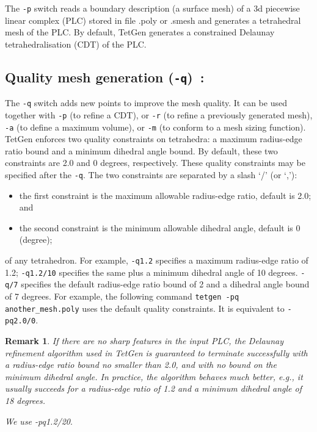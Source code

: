 \documentclass[12pt,twoside,a4paper]{article}
\numberwithin{equation}{section}
\newtheorem{remark}{Remark}[section]
\newcommand{\tetp}{\texttt{-p}}
\newcommand{\tetq}{\texttt{-q}}
\newcommand{\tetr}{\texttt{-r}}
\newcommand{\teta}{\texttt{-a}}
\newcommand{\tetm}{\texttt{-m}}
\begin{document}
The \tetp{} switch reads a boundary description (a surface mesh) of a 3d
piecewise linear complex (PLC) stored in file .poly or .smesh and
generates a tetrahedral mesh of the PLC.  By default, TetGen generates a
constrained Delaunay tetrahedralisation (CDT) of the PLC.


\subsection[Quality mesh generation]
{Quality mesh generation (\tetq{})~\cite[p. 39]{Si2013}:}

The \tetq{} switch adds new points to improve the mesh quality. It can be
used together with \tetp{} (to refine a CDT), or \tetr{} (to refine a
previously generated mesh), \teta{} (to define a maximum volume), or \tetm{}
(to conform to a mesh sizing function).  TetGen enforces two quality
constraints on tetrahedra: a maximum radius-edge ratio bound and a minimum
dihedral angle bound. By default, these two constraints are 2.0 and 0
degrees, respectively. These quality constraints may be specified after the
\tetq{}.  The two constraints are separated by a slash ‘/’ (or ‘,’):
\begin{itemize}
  \item the first constraint is the maximum allowable radius-edge ratio, 
    default is 2.0; and 
  \item the second constraint is the minimum allowable dihedral angle, 
    default is 0 (degree);
\end{itemize}
of any tetrahedron. For example, \texttt{-q1.2} specifies a maximum
radius-edge ratio of 1.2; \texttt{-q1.2/10} specifies the same plus a
minimum dihedral angle of 10 degrees. \texttt{-q/7} specifies the default
radius-edge ratio bound of 2 and a dihedral angle bound of 7 degrees.  For
example, the following command \texttt{tetgen -pq another\_mesh.poly} uses
the default quality constraints.  It is equivalent to \texttt{-pq2.0/0}.
\begin{remark}
  If there are no sharp features in the input PLC, the Delaunay refinement
  algorithm used in TetGen is guaranteed to terminate successfully with a
  radius-edge ratio bound no smaller than 2.0, and with no bound on the
  minimum dihedral angle. In practice, the algorithm behaves much better,
  e.g., it usually succeeds for a radius-edge ratio of 1.2 and a minimum
  dihedral angle of 18 degrees.
\end{remark}


{\color{red}  \emph{We use -pq1.2/20}}.
\end{document}

